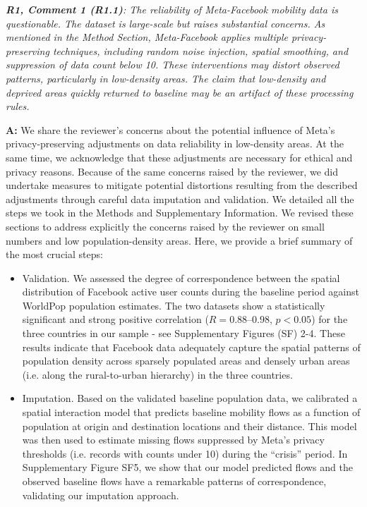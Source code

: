 \documentclass[12pt,a4paper,oneside, reqno]{amsart}
\begin{document}
\setlength{\leftskip}{0cm}\textit{\textbf{R1, Comment 1 (R1.1)}: The reliability of Meta-Facebook mobility data is questionable. The dataset is large-scale but raises substantial concerns. As mentioned in the Method Section, Meta-Facebook applies multiple privacy-preserving techniques, including random noise injection, spatial smoothing, and suppression of data count below 10. These interventions may distort observed patterns, particularly in low-density areas. The claim that low-density and deprived areas quickly returned to baseline may be an artifact of these processing rules.}

\setlength{\leftskip}{1cm}\textbf{A:} We share the reviewer’s concerns about the potential influence of Meta’s privacy-preserving adjustments on data reliability in low-density areas. At the same time, we acknowledge that these adjustments are necessary for ethical and privacy reasons. Because of the same concerns raised by the reviewer, we did undertake measures to mitigate potential distortions resulting from the described adjustments through careful data imputation and validation. We detailed all the steps we took in the Methods and Supplementary Information. We revised these sections to address explicitly the concerns raised by the reviewer on small numbers and low population-density areas. Here, we provide a brief summary of the most crucial steps:
\begin{itemize}[noitemsep, topsep=0pt]
    \item Validation. We assessed the degree of correspondence between the spatial distribution of Facebook active user counts during the baseline period against WorldPop population estimates. The two datasets show a statistically significant and strong positive correlation ($R = 0.88–0.98$, $p<0.05$) for the three countries in our sample - see Supplementary Figures (SF) 2-4. These results indicate that Facebook data adequately capture the spatial patterns of population density across sparsely populated areas and densely urban areas (i.e. along the rural-to-urban hierarchy) in the three countries. 
    \item Imputation. Based on the validated baseline population data, we calibrated a spatial interaction model that predicts baseline mobility flows as a function of population at origin and destination locations and their distance. This model was then used to estimate missing flows suppressed by Meta’s privacy thresholds (i.e. records with counts under 10) during the ``crisis'' period. In Supplementary Figure SF5, we show that our model predicted flows and the observed baseline flows have a remarkable patterns of correspondence, validating our imputation approach.
\end{itemize}
\end{document}
